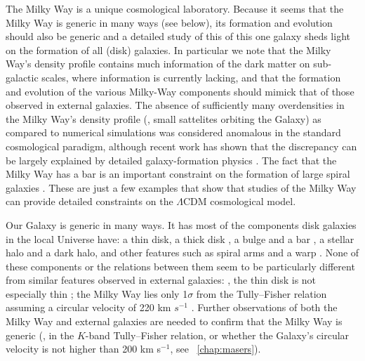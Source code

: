 The Milky Way is a unique cosmological laboratory. Because it seems
that the Milky Way is generic in many ways (see below), its formation
and evolution should also be generic and a detailed study of this of
this one galaxy sheds light on the formation of all (disk)
galaxies. In particular we note that the Milky Way's density profile
contains much information of the dark matter on sub-galactic scales,
where information is currently lacking, and that the formation and
evolution of the various Milky-Way components should mimick that of
those observed in external galaxies. The absence of sufficiently many
overdensities in the Milky Way's density profile (\ie, small
sattelites orbiting the Galaxy) as compared to numerical
simulations \citep{Klypin99a,Moore99a} was considered anomalous in the
standard cosmological paradigm, although recent work has shown that
the discrepancy can be largely explained by detailed galaxy-formation
physics \citep[\eg,][]{Koposov:2009ru}. The fact that the Milky Way
has a bar is an important constraint on the formation of large spiral
galaxies \citep{Klypin02a}. These are just a few examples that show
that studies of the Milky Way can provide detailed constraints on the
$\Lambda$CDM cosmological model.

Our Galaxy is generic in many ways. It has most of the components disk
galaxies in the local Universe have: a thin disk, a thick
disk \citep{1983MNRAS.202.1025G}, a bulge and a bar \citep{Blitz91a},
a stellar halo \citep{Freeman87a} and a dark halo, and other features
such as spiral arms \citep{Georgelin76a} and a
warp \citep{Levine06a,Reyle09a}. None of these components or the
relations between them seem to be particularly different from similar
features observed in external galaxies: \eg, the thin disk is not
especially thin \citep{Juric08a}; the Milky Way lies only 1$\sigma$ from
the Tully--Fisher relation assuming a circular velocity of 220 km
$s^{-1}$ \citep{Flynn06a}. Further observations of both the Milky Way
and external galaxies are needed to confirm that the Milky Way is
generic (\eg, in the $K$-band Tully--Fisher relation, or whether the
Galaxy's circular velocity is not higher than 200 km s$^{-1}$,
see \chaptername~\ref{chap:masers}).

